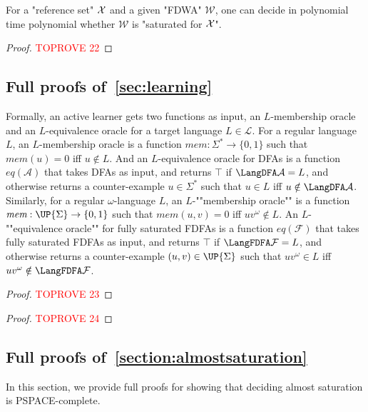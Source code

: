 \documentclass[a4paper,USenglish,cleveref,autoref,thm-restate]{lipics-v2021}
\newcommand{\mc}[1]{\ensuremath{\mathcal{#1}}}
\newcommand{\A}{\mc{A}}
\newcommand{\F}{\mc{F}}
\renewcommand{\L}{\mc{L}}
\newcommand{\W}{\mc{W}}
\newcommand{\PSPACE}{\textsf{PSPACE}\xspace}
\newcommand{\moracle}{\textit{mem}}
\newcommand{\eoracle}{\textit{eq}}
\begin{document}
{\begin{theorem}
  For a "reference set" $\mathcal{X}$ and a given "FDWA" $\W$, one can decide in polynomial time polynomial whether $\W$ is "saturated for $\mathcal{X}$".
  \label{app:theorem:ptimesaturationFDWA}
\end{theorem}
\begin{proof}\textcolor{red}{TOPROVE 22}\end{proof}

 \subsection{Full proofs of~\cref{sec:learning}}\label{section:appendixlearning}

Formally, an active learner gets two functions as input, an $L$-membership oracle and an $L$-equivalence oracle for a target language $L \in \L$. For a regular language $L$, an $L$-membership oracle is a function $\moracle:\Sigma^* \rightarrow \{0,1\}$ such that $\moracle(u) = 0$ iff $u \notin L$. And an $L$-equivalence oracle for DFAs is a function $\eoracle(\A)$ that takes DFAs as input, and returns $\top$ if $\LangDFA\A = L$, and otherwise returns a counter-example $u \in \Sigma^*$ such that $u \in L$ iff $u \notin \LangDFA\A$. Similarly, for a regular $\omega$-language $L$, an \AP $L$-""membership oracle"" is a function $\moracle: \UP{\Sigma} \rightarrow \{0,1\}$ such that $\moracle(u,v) = 0$ iff $uv^\omega \notin L$. An \AP $L$-""equivalence oracle"" for fully saturated FDFAs is a function $\eoracle(\F)$ that takes fully saturated FDFAs as input, and returns $\top$ if $\LangFDFA\F = L$, and otherwise returns a counter-example $(u,v) \in \UP{\Sigma}$ such that $uv^\omega \in L$ iff $uv^\omega \notin \LangFDFA\F$.

\activelearner*
\begin{proof}\textcolor{red}{TOPROVE 23}\end{proof}


\passivelearner*
\begin{proof}\textcolor{red}{TOPROVE 24}\end{proof}


 \subsection{Full proofs of~\cref{section:almostsaturation}}\label{section:appendixalmostsaturation}
In this section, we provide full proofs for showing that deciding almost saturation is \PSPACE-complete.

}
\end{document}
